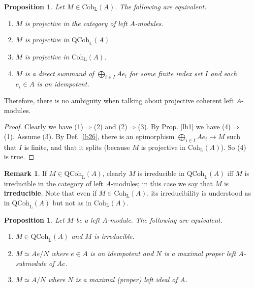 \documentclass[11pt,b5paper,notitlepage]{article}
\theoremstyle{definition}
\newtheorem{rem}[df]{Remark}
\theoremstyle{plain}
\newtheorem{pp}[df]{Proposition}
\newcommand{\QC}{\mathrm{QCoh}_{\mathrm L}}
\newcommand{\Coh}{\mathrm{Coh}_{\mathrm L}}
\numberwithin{equation}{section}
\begin{document}
\begin{pp}\label{lb2}
Let $M\in\Coh(A)$. The following are equivalent.
\begin{enumerate}[label=(\arabic*)]
\item $M$ is projective in the category of left $A$-modules.
\item $M$ is projective in $\QC(A)$.
\item $M$ is projective in $\Coh(A)$.
\item $M$ is a direct summand of $\bigoplus_{i\in I}Ae_i$ for some \textit{finite} index set $I$ and each $e_i\in A$ is an idempotent.
\end{enumerate} 
\end{pp}

Therefore, there is no ambiguity when talking about projective coherent left $A$-modules.


\begin{proof}
Clearly we have (1)$\Rightarrow$(2) and (2)$\Rightarrow$(3). By Prop. \ref{lb1} we have (4)$\Rightarrow$(1). Assume (3). By Def. \ref{lb26}, there is an epimorphism $\bigoplus_{i\in I}Ae_i\rightarrow M$ such that $I$ is finite, and that it splits (because $M$ is projective in $\Coh(A)$). So (4) is true.
\end{proof}






\begin{rem}\label{lb10}
If $M\in\QC(A)$, clearly $M$ is irreducible in $\QC(A)$ iff $M$ is irreducible in the category of left $A$-modules; in this case we say that $M$ is \textbf{irreducible}. Note that even if $M\in\Coh(A)$, its irreducibility is understood as in $\QC(A)$ but not as in $\Coh(A)$.
\end{rem}


\begin{pp}\label{lb19}
Let $M$ be a left $A$-module. The following are equivalent.
\begin{enumerate}[label=(\arabic*)]
\item $M\in\QC(A)$ and $M$ is irreducible.
\item $M\simeq Ae/N$ where $e\in A$ is an idempotent and $N$ is a maximal proper left $A$-submodule of $Ae$.
\item $M\simeq A/N$ where $N$ is a maximal (proper) left ideal of $A$.
\end{enumerate}
\end{pp}
\end{document}
